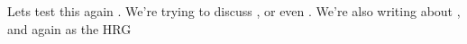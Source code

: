 \documentclass[a4paper,australian,oneside,10pt,footlines=3]{scrbook}%
\newcommand{\biblatex}{\texttt{biblatex}}
\theoremstyle{remark}
\begin{document}
Lets test this again \parencite{HREOC1997}. We're trying to discuss \textcite{HREOC1997}, or even \textcite{HREOC1998}.
We're also writing about \textcite{UniSA-HRG}, and again as the HRG \parencite{UniSAHorizon2020}
\textcite{ABS2010}
\printbibliography[heading=bibintoc,nottype=artwork]
\end{document}
